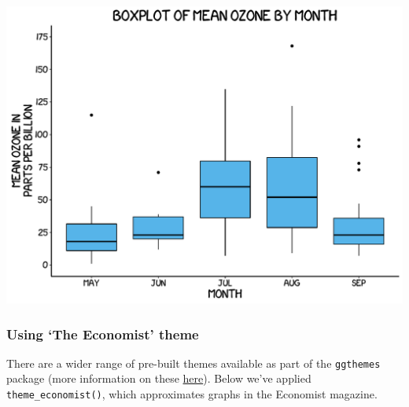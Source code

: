 \documentclass[]{article}
\begin{document}
\begin{center}\includegraphics{0_all_posts_pdf/box_11-1} \end{center}

\subsubsection{\texorpdfstring{Using `The Economist'
theme}{Using The Economist theme}}\label{using-the-economist-theme-9}

There are a wider range of pre-built themes available as part of the
\texttt{ggthemes} package (more information on these
\href{https://cran.r-project.org/web/packages/ggthemes/vignettes/ggthemes.html}{here}).
Below we've applied \texttt{theme\_economist()}, which approximates
graphs in the Economist magazine.
\end{document}
